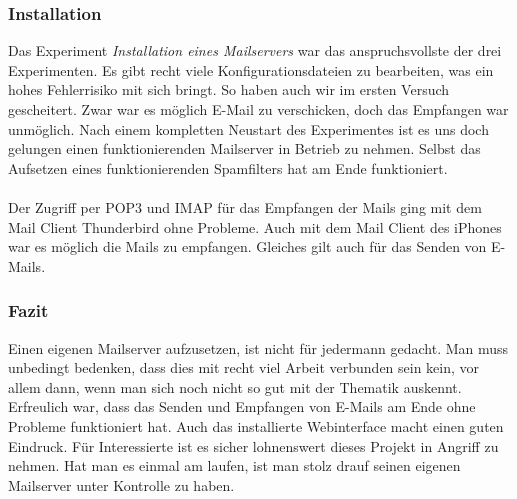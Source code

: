 \subsubsection{Installation}
Das Experiment \textit{Installation eines Mailservers} war das anspruchsvollste der drei Experimenten. Es gibt recht viele Konfigurationsdateien zu bearbeiten, was ein hohes Fehlerrisiko mit sich bringt.
So haben auch wir im ersten Versuch gescheitert. Zwar war es möglich E-Mail zu verschicken, doch das Empfangen war unmöglich.
Nach einem kompletten Neustart des Experimentes ist es uns doch gelungen einen funktionierenden Mailserver in Betrieb zu nehmen.
Selbst das Aufsetzen eines funktionierenden Spamfilters hat am Ende funktioniert. \\ \\
Der Zugriff per POP3 und IMAP für das Empfangen der Mails ging mit dem Mail Client Thunderbird ohne Probleme. Auch mit dem Mail Client des iPhones war es möglich die Mails zu empfangen. Gleiches gilt auch für das Senden von E-Mails.

\subsubsection{Fazit}
Einen eigenen Mailserver aufzusetzen, ist nicht für jedermann gedacht. Man muss unbedingt bedenken, dass dies mit recht viel Arbeit verbunden sein kein, vor allem dann, wenn man sich noch nicht so gut mit der Thematik auskennt.
Erfreulich war, dass das Senden und Empfangen von E-Mails am Ende ohne Probleme funktioniert hat. Auch das installierte Webinterface macht einen guten Eindruck.
Für Interessierte ist es sicher lohnenswert dieses Projekt in Angriff zu nehmen. Hat man es einmal am laufen, ist man stolz drauf seinen eigenen Mailserver unter Kontrolle zu haben.
